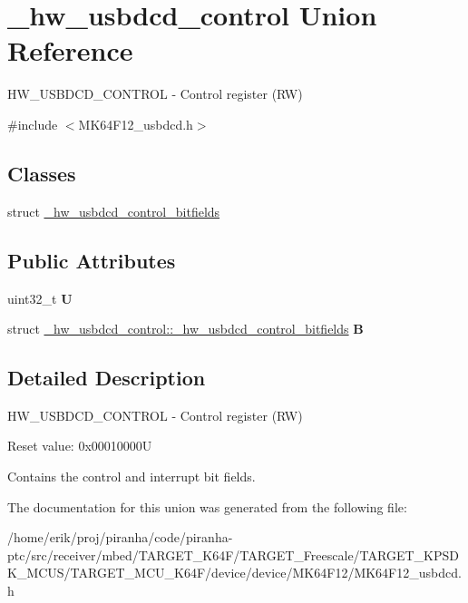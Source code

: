 \hypertarget{union__hw__usbdcd__control}{}\section{\+\_\+hw\+\_\+usbdcd\+\_\+control Union Reference}
\label{union__hw__usbdcd__control}


H\+W\+\_\+\+U\+S\+B\+D\+C\+D\+\_\+\+C\+O\+N\+T\+R\+OL -\/ Control register (RW)  




{\ttfamily \#include $<$M\+K64\+F12\+\_\+usbdcd.\+h$>$}

\subsection*{Classes}
\begin{DoxyCompactItemize}
\item 
struct \hyperlink{struct__hw__usbdcd__control_1_1__hw__usbdcd__control__bitfields}{\+\_\+hw\+\_\+usbdcd\+\_\+control\+\_\+bitfields}
\end{DoxyCompactItemize}
\subsection*{Public Attributes}
\begin{DoxyCompactItemize}
\item 
uint32\+\_\+t {\bfseries U}\hypertarget{union__hw__usbdcd__control_ab2a932c74d262594ced8aba5aee3ea04}{}\label{union__hw__usbdcd__control_ab2a932c74d262594ced8aba5aee3ea04}

\item 
struct \hyperlink{struct__hw__usbdcd__control_1_1__hw__usbdcd__control__bitfields}{\+\_\+hw\+\_\+usbdcd\+\_\+control\+::\+\_\+hw\+\_\+usbdcd\+\_\+control\+\_\+bitfields} {\bfseries B}\hypertarget{union__hw__usbdcd__control_abf54ac537d99b9728ddbcffbbae9c9bd}{}\label{union__hw__usbdcd__control_abf54ac537d99b9728ddbcffbbae9c9bd}

\end{DoxyCompactItemize}


\subsection{Detailed Description}
H\+W\+\_\+\+U\+S\+B\+D\+C\+D\+\_\+\+C\+O\+N\+T\+R\+OL -\/ Control register (RW) 

Reset value\+: 0x00010000U

Contains the control and interrupt bit fields. 

The documentation for this union was generated from the following file\+:\begin{DoxyCompactItemize}
\item 
/home/erik/proj/piranha/code/piranha-\/ptc/src/receiver/mbed/\+T\+A\+R\+G\+E\+T\+\_\+\+K64\+F/\+T\+A\+R\+G\+E\+T\+\_\+\+Freescale/\+T\+A\+R\+G\+E\+T\+\_\+\+K\+P\+S\+D\+K\+\_\+\+M\+C\+U\+S/\+T\+A\+R\+G\+E\+T\+\_\+\+M\+C\+U\+\_\+\+K64\+F/device/device/\+M\+K64\+F12/M\+K64\+F12\+\_\+usbdcd.\+h\end{DoxyCompactItemize}
